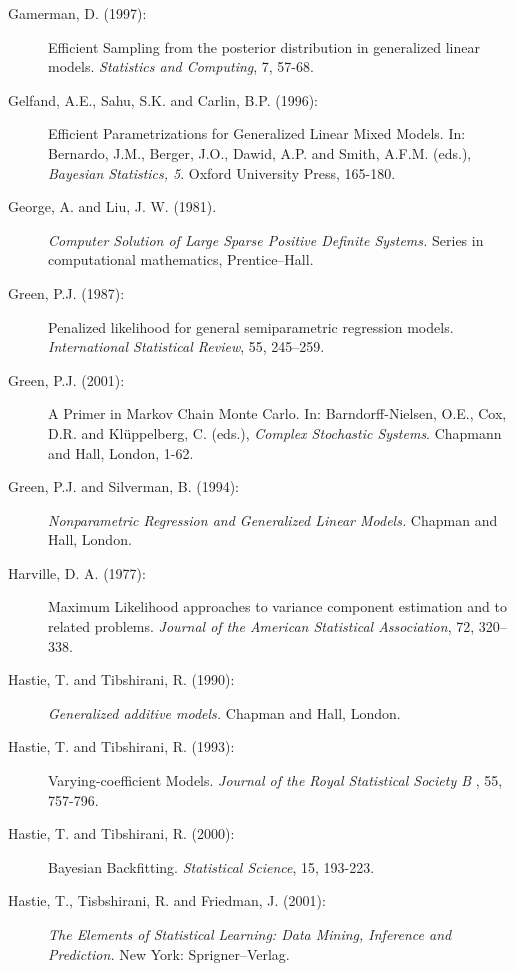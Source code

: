 \begin{description}
\item[Gamerman, D. (1997):] Efficient Sampling from the posterior distribution
in generalized linear models. {\em Statistics and Computing}, 7,
57-68.

\item[Gelfand, A.E., Sahu, S.K. and Carlin, B.P. (1996):] Efficient Parametrizations for
Generalized Linear Mixed Models. In: Bernardo, J.M., Berger, J.O.,
Dawid, A.P. and Smith, A.F.M. (eds.), {\em Bayesian Statistics,
5}. Oxford University Press, 165-180.

\item[George, A. and Liu, J. W. (1981).] {\em Computer Solution of Large
Sparse Positive Definite Systems.} Series in computational
mathematics, Prentice--Hall.

\item[Green, P.J. (1987):] Penalized
likelihood for general semiparametric regression models. {\it
International Statistical Review}, 55, 245--259.

\item[Green, P.J. (2001):] A Primer in Markov Chain Monte Carlo. In: Barndorff-Nielsen, O.E.,
Cox, D.R. and Kl{\"u}ppelberg, C. (eds.), {\em Complex Stochastic
Systems}. Chapmann and Hall, London, 1-62.

\item[Green, P.J. and Silverman, B. (1994):] {\em Nonparametric Regression and Generalized Linear Models.} Chapman
and Hall, London.

\item[Harville, D. A. (1977):]
Maximum Likelihood approaches to variance component estimation and
to related problems. {\it Journal of the American Statistical
Association}, 72, 320--338.


\item[Hastie, T. and Tibshirani, R. (1990):] {\em Generalized additive models.} Chapman and
Hall, London.

\item[Hastie, T. and Tibshirani, R. (1993):] Varying-coefficient Models.
{\em Journal of the Royal Statistical Society B} , 55, 757-796.

\item[Hastie, T. and Tibshirani, R. (2000):] Bayesian Backfitting. {\em Statistical Science}, 15, 193-223.

\item[Hastie, T., Tisbshirani, R. and Friedman, J. (2001):] {\em The Elements of Statistical Learning: Data Mining,
Inference and Prediction.} New York: Sprigner--Verlag.


\end{description}
